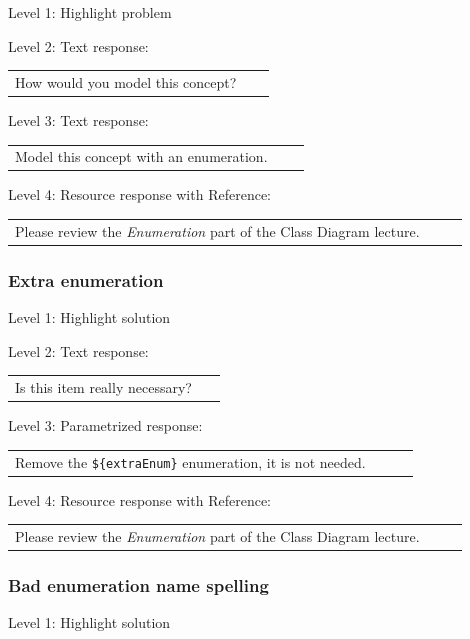 \noindent Level 1: Highlight problem \medskip

\noindent Level 2: Text response: \medskip

\begin{tabular}{|p{0.9\linewidth}}
How would you model this concept?
\end{tabular} \medskip

\noindent Level 3: Text response: \medskip

\begin{tabular}{|p{0.9\linewidth}}
Model this concept with an enumeration.
\end{tabular} \medskip

\noindent Level 4: Resource response with Reference: \medskip

\begin{tabular}{|p{0.9\linewidth}}
Please review the \textit{Enumeration} part of the Class Diagram lecture.
\end{tabular} \medskip


\subsubsection{Extra enumeration}

\noindent Level 1: Highlight solution \medskip

\noindent Level 2: Text response: \medskip

\begin{tabular}{|p{0.9\linewidth}}
Is this item really necessary?
\end{tabular} \medskip

\noindent Level 3: Parametrized response: \medskip

\begin{tabular}{|p{0.9\linewidth}}
Remove the \verb|${extraEnum}| enumeration, it is not needed.
\end{tabular} \medskip

\noindent Level 4: Resource response with Reference: \medskip

\begin{tabular}{|p{0.9\linewidth}}
Please review the \textit{Enumeration} part of the Class Diagram lecture.
\end{tabular} \medskip


\subsubsection{Bad enumeration name spelling}

\noindent Level 1: Highlight solution \medskip

